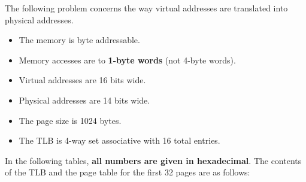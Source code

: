 \begin{problem}{10}
The following problem concerns 
the way virtual addresses are translated into physical addresses.
\end{problem}

\begin{itemize}
\item The memory is byte addressable.
\item Memory accesses are to {\bf 1-byte words} (not 4-byte words).
\item Virtual addresses are 16 bits wide.
\item Physical addresses are 14 bits wide.
\item The page size is 1024 bytes.
\item The TLB is 4-way set associative with 16 total entries.
\end{itemize}

In the following tables, {\bf all numbers are given in hexadecimal}.
The contents of the TLB and the page table for the first 32 pages
are as follows:

